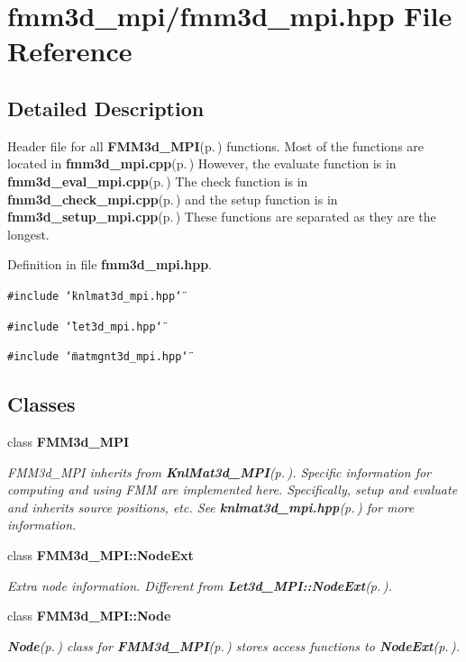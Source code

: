 \section{fmm3d\_\-mpi/fmm3d\_\-mpi.hpp File Reference}
\label{fmm3d__mpi_8hpp}


\subsection{Detailed Description}
Header file for all {\bf FMM3d\_\-MPI}{\rm (p.\,\pageref{classFMM3d__MPI})} functions. Most of the functions are located in {\bf fmm3d\_\-mpi.cpp}{\rm (p.\,\pageref{fmm3d__mpi_8cpp})} However, the evaluate function is in {\bf fmm3d\_\-eval\_\-mpi.cpp}{\rm (p.\,\pageref{fmm3d__eval__mpi_8cpp})} The check function is in {\bf fmm3d\_\-check\_\-mpi.cpp}{\rm (p.\,\pageref{fmm3d__check__mpi_8cpp})} and the setup function is in {\bf fmm3d\_\-setup\_\-mpi.cpp}{\rm (p.\,\pageref{fmm3d__setup__mpi_8cpp})} These functions are separated as they are the longest. 

Definition in file {\bf fmm3d\_\-mpi.hpp}.

{\tt \#include \char`\"{}knlmat3d\_\-mpi.hpp\char`\"{}}\par
{\tt \#include \char`\"{}let3d\_\-mpi.hpp\char`\"{}}\par
{\tt \#include \char`\"{}matmgnt3d\_\-mpi.hpp\char`\"{}}\par
\subsection*{Classes}
\begin{CompactItemize}
\item 
class {\bf FMM3d\_\-MPI}
\begin{CompactList}\small\item\em FMM3d\_\-MPI inherits from {\bf Knl\-Mat3d\_\-MPI}{\rm (p.\,\pageref{classKnlMat3d__MPI})}. Specific information for computing and using FMM are implemented here. Specifically, setup and evaluate and inherits source positions, etc. See {\bf knlmat3d\_\-mpi.hpp}{\rm (p.\,\pageref{knlmat3d__mpi_8hpp})} for more information. \item\end{CompactList}\item 
class {\bf FMM3d\_\-MPI::Node\-Ext}
\begin{CompactList}\small\item\em Extra node information. Different from {\bf Let3d\_\-MPI::Node\-Ext}{\rm (p.\,\pageref{classLet3d__MPI_1_1NodeExt})}. \item\end{CompactList}\item 
class {\bf FMM3d\_\-MPI::Node}
\begin{CompactList}\small\item\em {\bf Node}{\rm (p.\,\pageref{classFMM3d__MPI_1_1Node})} class for {\bf FMM3d\_\-MPI}{\rm (p.\,\pageref{classFMM3d__MPI})} stores access functions to {\bf Node\-Ext}{\rm (p.\,\pageref{classFMM3d__MPI_1_1NodeExt})}. \item\end{CompactList}\end{CompactItemize}

